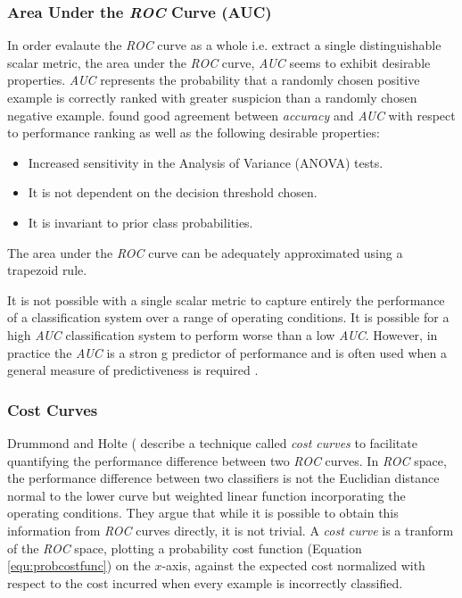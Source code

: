 \documentclass[10pt]{unbthesis}
\begin{document}
\subsubsection{Area Under the \textit{ROC} Curve (AUC)}
In order evalaute the \textit{ROC} curve as a whole i.e. extract a
single distinguishable scalar metric, the area under the \textit{ROC}
curve, \textit{AUC} seems to exhibit desirable
properties. \textit{AUC} represents the probability that a randomly
chosen positive example is correctly ranked with greater suspicion
than a randomly chosen negative example. \cite{Refworks:32} found good
agreement between \textit{accuracy} and \textit{AUC} with respect to
performance ranking as well as the following desirable properties:

\begin{itemize}
\item Increased sensitivity in the Analysis of Variance (ANOVA) tests.
\item It is not dependent on the decision threshold chosen.
\item It is invariant to prior class probabilities.
\end{itemize}

The area under the \textit{ROC} curve can be adequately approximated
using a trapezoid rule.

It is not possible with a single scalar metric to capture
entirely the performance of a classification system over a range of
operating conditions. It is possible for a high \textit{AUC}
classification system to perform worse than a low
\textit{AUC}. However, in practice the \textit{AUC} is a stron g
predictor of performance and is often used when a general measure of
predictiveness is required \cite{RefWorks:39}.


\subsubsection{Cost Curves}
Drummond and Holte (\cite{RefWorks:52} describe a technique called
\textit{cost curves} to facilitate quantifying the performance
difference between two \textit{ROC} curves. In \textit{ROC} space, the
performance difference between two classifiers is not the Euclidian
distance normal to the lower curve but weighted linear function
incorporating the operating conditions. They argue that while it
is possible to obtain this information from \textit{ROC} curves
directly, it is not trivial. A \textit{cost curve} is a tranform of
the \textit{ROC} space, plotting a probability cost function (Equation
\ref{equ:probcostfunc}) on the \(x\)-axis, against the expected cost
normalized with respect to the cost incurred when every example is
incorrectly classified. 
\end{document}
